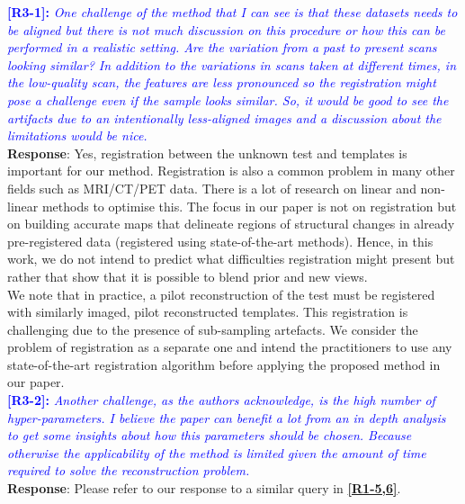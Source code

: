 \documentclass[11pt]{article}
\begin{document}
\vspace{0.5cm}\textcolor{blue}{\textbf{[R3-1]:} \textit{One challenge of the method that I can see is that these datasets needs to be aligned but there is not much discussion on this procedure or how this can be performed in a realistic setting. Are the variation from a past to present scans looking similar? In addition to the variations in scans taken at different times, in the low-quality scan, the features are less pronounced so the registration might pose a challenge even if the sample looks similar. So, it would be good to see the artifacts due to an intentionally less-aligned images and a discussion about the limitations would be nice.
}}\\

\textbf{Response}: Yes, registration between the unknown test and templates is important for our method. Registration is also a common problem in many other fields such as MRI/CT/PET data.  There is a lot of research on linear and non-linear methods to optimise this. The focus in our paper is not on registration but on building accurate maps that delineate regions of structural changes in already pre-registered data (registered using state-of-the-art methods).  Hence, in this work, we do not intend to predict what difficulties registration might present but rather that show that it is possible to blend prior and new views.\\

We note that in practice, a pilot reconstruction of the test must be registered with similarly imaged, pilot reconstructed templates. This registration is challenging due to the presence of sub-sampling artefacts. We consider the problem of registration as a separate one and intend the practitioners to use any state-of-the-art registration algorithm before applying the proposed method in our paper. 
\\

\vspace{0.5cm}\textcolor{blue}{\textbf{[R3-2]:} \textit{Another challenge, as the authors acknowledge, is the high number of hyper-parameters. I believe the paper can benefit a lot from an in depth analysis to get some insights about how this parameters should be chosen. Because otherwise the applicability of the method is limited given the amount of time required to solve the reconstruction problem.
}}\\

\textbf{Response}: Please refer to our response to a similar query in \textcolor{blue}{\textbf{\hyperlink{hyperparameters}{[R1-5,6]}}}.\\
\end{document}
